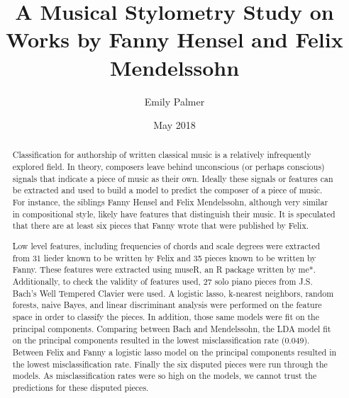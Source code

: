 \documentclass[12pt,twoside]{reedthesis}
\title{A Musical Stylometry Study on Works by Fanny Hensel and Felix
Mendelssohn}
\author{Emily Palmer}
\date{May 2018}
\theoremstyle{definition}
\theoremstyle{definition}
\theoremstyle{definition}
\theoremstyle{remark}
\begin{document}
  \maketitle

\frontmatter %
\pagestyle{empty} %



  \hypersetup{linkcolor=black}
  \setcounter{tocdepth}{2}
  \tableofcontents

  \listoftables

  \listoffigures
  \begin{abstract}
    Classification for authorship of written classical music is a relatively
    infrequently explored field. In theory, composers leave behind
    unconscious (or perhaps conscious) signals that indicate a piece of
    music as their own. Ideally these signals or features can be extracted
    and used to build a model to predict the composer of a piece of music.
    For instance, the siblings Fanny Hensel and Felix Mendelssohn, although
    very similar in compositional style, likely have features that
    distinguish their music. It is speculated that there are at least six
    pieces that Fanny wrote that were published by Felix.
    
    Low level features, including frequencies of chords and scale degrees
    were extracted from 31 lieder known to be written by Felix and 35 pieces
    known to be written by Fanny. These features were extracted using museR,
    an R package written by me*. Additionally, to check the validity of
    features used, 27 solo piano pieces from J.S. Bach's Well Tempered
    Clavier were used. A logistic lasso, k-nearest neighbors, random
    forests, naive Bayes, and linear discriminant analysis were performed on
    the feature space in order to classify the pieces. In addition, those
    same models were fit on the principal components. Comparing between Bach
    and Mendelssohn, the LDA model fit on the principal components resulted
    in the lowest misclassification rate (0.049). Between Felix and Fanny a
    logistic lasso model on the principal components resulted in the lowest
    misclassification rate. Finally the six disputed pieces were run through
    the models. As misclassification rates were so high on the models, we
    cannot trust the predictions for these disputed pieces.
  \end{abstract}

\mainmatter %
\pagestyle{fancyplain} %
\end{document}
